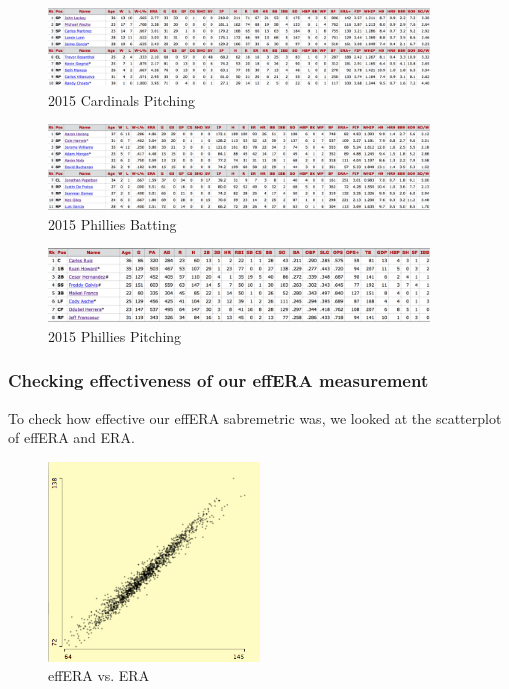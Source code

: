 \documentclass[12pt]{article}
\numberwithin{equation}{subsection}
\begin{document}
\begin{figure}[H]
	\centering
	\includegraphics[width=0.9\textwidth]{infograph2}
    \caption{2015 Cardinals Pitching}
\end{figure}

\begin{figure}[H]
	\centering
	\includegraphics[width=0.9\textwidth]{infograph3}
    \caption{2015 Phillies Batting}
\end{figure}

\begin{figure}[H]
	\centering
	\includegraphics[width=0.9\textwidth]{infograph4}
    \caption{2015 Phillies Pitching}
\end{figure}


\subsubsection{Checking effectiveness of our effERA measurement}
To check how effective our effERA sabremetric was, we looked at the scatterplot of effERA and ERA.

\begin{figure}[H]
	\centering
	\includegraphics[width=0.5\textwidth]{effERA}
    \caption{effERA vs. ERA}
\end{figure}
\end{document}
